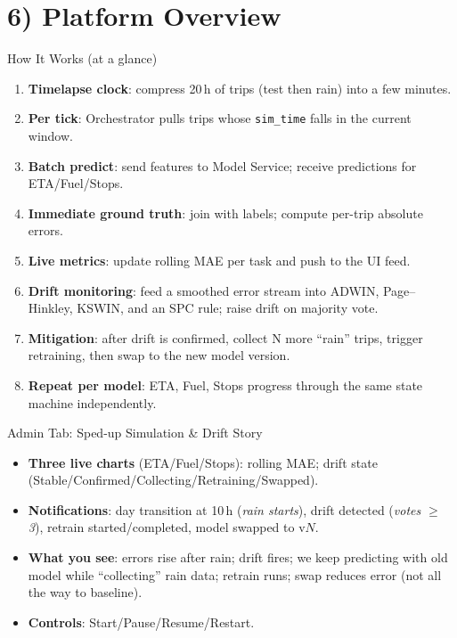 \documentclass[aspectratio=169]{beamer}
\begin{document}
\section{6) Platform Overview}
\begin{frame}{How It Works (at a glance)}
\begin{enumerate}
\item \textbf{Timelapse clock}: compress 20\,h of trips (test then rain) into a few minutes.
\item \textbf{Per tick}: Orchestrator pulls trips whose \texttt{sim\_time} falls in the current window.
\item \textbf{Batch predict}: send features to Model Service; receive predictions for ETA/Fuel/Stops.
\item \textbf{Immediate ground truth}: join with labels; compute per-trip absolute errors.
\item \textbf{Live metrics}: update rolling MAE per task and push to the UI feed.
\item \textbf{Drift monitoring}: feed a smoothed error stream into ADWIN, Page--Hinkley, KSWIN, and an SPC rule; raise drift on majority vote.
\item \textbf{Mitigation}: after drift is confirmed, collect N more “rain” trips, trigger retraining, then swap to the new model version.
\item \textbf{Repeat per model}: ETA, Fuel, Stops progress through the same state machine independently.
\end{enumerate}
\end{frame}

\begin{frame}{Admin Tab: Sped-up Simulation \& Drift Story}
\begin{itemize}
\item \textbf{Three live charts} (ETA/Fuel/Stops): rolling MAE; drift state (Stable/Confirmed/Collecting/Retraining/Swapped).
\item \textbf{Notifications}: day transition at 10\,h (\emph{rain starts}), drift detected (\emph{votes \(\ge\)3}), retrain started/completed, model swapped to v\(N\).
\item \textbf{What you see}: errors rise after rain; drift fires; we keep predicting with old model while “collecting” rain data; retrain runs; swap reduces error (not all the way to baseline).
\item \textbf{Controls}: Start/Pause/Resume/Restart.
\end{itemize}
\end{frame}
\end{document}

